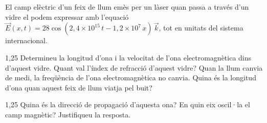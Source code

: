 El camp elèctric d'un feix de llum emès per un làser quan passa a través d'un vidre el podem expressar amb l'equació $\vec{E}(x, t) = 28\cos(2,4\times 10^{15}\,t - 1,2\times 10^{7}\,x)\,\vec{k}$, tot en unitats del sistema internacional.

\begin{apartat}{1,25}
Determineu la longitud d'ona i la velocitat de l'ona electromagnètica dins d'aquest vidre. Quant val l'índex de refracció d'aquest vidre? Quan la llum canvia de medi, la freqüència de l'ona electromagnètica no canvia. Quina és la longitud d'ona quan aquest feix de llum viatja pel buit?
\end{apartat}

\begin{apartat}{1,25}
Quina és la direcció de propagació d'aquesta ona? En quin eix oscil·la el camp magnètic? Justifiqueu la resposta.
\end{apartat}

